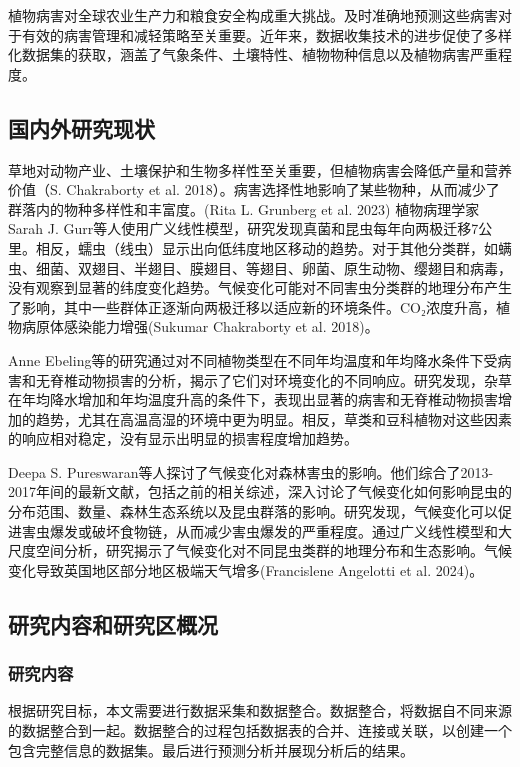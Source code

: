 \documentclass{article}
\begin{document}
	植物病害对全球农业生产力和粮食安全构成重大挑战。及时准确地预测这些病害对于有效的病害管理和减轻策略至关重要。近年来，数据收集技术的进步促使了多样化数据集的获取，涵盖了气象条件、土壤特性、植物物种信息以及植物病害严重程度。
	
	\subsection{国内外研究现状}
		草地对动物产业、土壤保护和生物多样性至关重要，但植物病害会降低产量和营养价值（S. Chakraborty et al. 2018）。病害选择性地影响了某些物种，从而减少了群落内的物种多样性和丰富度。(Rita L. Grunberg et al. 2023)
	植物病理学家Sarah J. Gurr等人使用广义线性模型，研究发现真菌和昆虫每年向两极迁移7公里。相反，蠕虫（线虫）显示出向低纬度地区移动的趋势。对于其他分类群，如螨虫、细菌、双翅目、半翅目、膜翅目、等翅目、卵菌、原生动物、缨翅目和病毒，没有观察到显著的纬度变化趋势。气候变化可能对不同害虫分类群的地理分布产生了影响，其中一些群体正逐渐向两极迁移以适应新的环境条件。CO₂浓度升高，植物病原体感染能力增强(Sukumar Chakraborty et al. 2018)。
	
	Anne Ebeling等的研究通过对不同植物类型在不同年均温度和年均降水条件下受病害和无脊椎动物损害的分析，揭示了它们对环境变化的不同响应。研究发现，杂草在年均降水增加和年均温度升高的条件下，表现出显著的病害和无脊椎动物损害增加的趋势，尤其在高温高湿的环境中更为明显。相反，草类和豆科植物对这些因素的响应相对稳定，没有显示出明显的损害程度增加趋势。
	
	Deepa S. Pureswaran等人探讨了气候变化对森林害虫的影响。他们综合了2013-2017年间的最新文献，包括之前的相关综述，深入讨论了气候变化如何影响昆虫的分布范围、数量、森林生态系统以及昆虫群落的影响。研究发现，气候变化可以促进害虫爆发或破坏食物链，从而减少害虫爆发的严重程度。通过广义线性模型和大尺度空间分析，研究揭示了气候变化对不同昆虫类群的地理分布和生态影响。气候变化导致英国地区部分地区极端天气增多(Francislene Angelotti et al. 2024)。

	\subsection{研究内容和研究区概况}
	
	\subsubsection{研究内容}
	
	根据研究目标，本文需要进行数据采集和数据整合。数据整合，将数据自不同来源的数据整合到一起。数据整合的过程包括数据表的合并、连接或关联，以创建一个包含完整信息的数据集。最后进行预测分析并展现分析后的结果。
	
\end{document}
